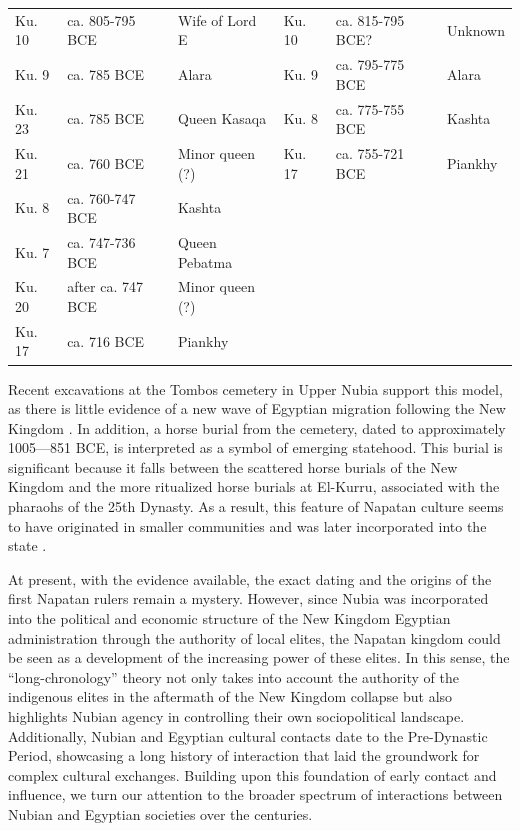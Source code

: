 {\begin{xltabular}{\textwidth}{X X X X X X}
		\cmidrule(r){1-3} \cmidrule(l){4-6}
		Ku. 10 & ca. 805-795 BCE & Wife of Lord E & Ku. 10 & ca. 815-795 BCE? & Unknown \\
		\cmidrule(r){1-3} \cmidrule(l){4-6}
		Ku. 9 & ca. 785 BCE & Alara & Ku. 9 & ca. 795-775 BCE & Alara \\
		\cmidrule(r){1-3} \cmidrule(l){4-6}
		Ku. 23 & ca. 785 BCE & Queen Kasaqa & Ku. 8 & ca. 775-755 BCE & Kashta \\
		\cmidrule(r){1-3} \cmidrule(l){4-6}
		Ku. 21 & ca. 760 BCE & Minor queen (?) & Ku. 17 & ca. 755-721 BCE & Piankhy \\
		\cmidrule(r){1-3} \cmidrule(l){4-6}
		Ku. 8 & ca. 760-747 BCE & Kashta & & & \\
		\cmidrule(r){1-3} \cmidrule(l){4-6}
		Ku. 7 & ca. 747-736 BCE & Queen Pebatma & & & \\
		\cmidrule(r){1-3} \cmidrule(l){4-6}
		Ku. 20 & after ca. 747 BCE & Minor queen (?) & & & \\
		\cmidrule(r){1-3} \cmidrule(l){4-6}
		Ku. 17 & ca. 716 BCE & Piankhy & & & \\
	\end{xltabular}
}

Recent excavations at the Tombos cemetery in Upper Nubia support this model, as there is little evidence of a new wave of Egyptian migration following the New Kingdom \parencite{buzonEntanglementFormationAncient2016}. In addition, a horse burial from the cemetery, dated to approximately 1005—851 BCE, is interpreted as a symbol of emerging statehood. This burial is significant because it falls between the scattered horse burials of the New Kingdom and the more ritualized horse burials at El-Kurru, associated with the pharaohs of the 25th Dynasty. As a result, this feature of Napatan culture seems to have originated in smaller communities and was later incorporated into the state \parencite{schraderColonialindigeneInteractionAncient2018}.

At present, with the evidence available, the exact dating and the origins of the first Napatan rulers remain a mystery. However, since Nubia was incorporated into the political and economic structure of the New Kingdom Egyptian administration through the authority of local elites, the Napatan kingdom could be seen as a development of the increasing power of these elites. In this sense, the “long-chronology” theory not only takes into account the authority of the indigenous elites in the aftermath of the New Kingdom collapse but also highlights Nubian agency in controlling their own sociopolitical landscape. Additionally, Nubian and Egyptian cultural contacts date to the Pre-Dynastic Period, showcasing a long history of interaction that laid the groundwork for complex cultural exchanges. Building upon this foundation of early contact and influence, we turn our attention to the broader spectrum of interactions between Nubian and Egyptian societies over the centuries.

